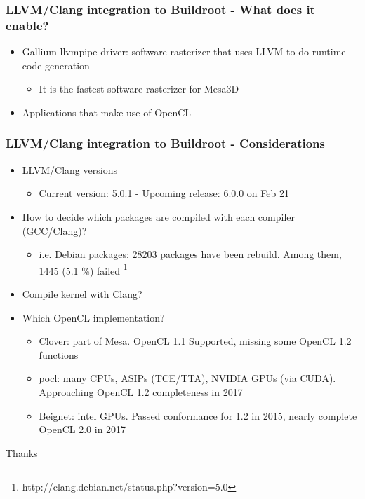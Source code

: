 \documentclass{beamer}
\begin{document}
\begin{frame}
\frametitle{LLVM/Clang integration to Buildroot - What does it enable?}
\begin{itemize}
  \item Gallium llvmpipe driver: software rasterizer that uses LLVM to do runtime code generation
  \begin{itemize}
    \item It is the fastest software rasterizer for Mesa3D
  \end{itemize}
  \item Applications that make use of OpenCL
\end{itemize}
\end{frame}

\begin{frame}
\frametitle{LLVM/Clang integration to Buildroot - Considerations}
\begin{itemize}
  \item LLVM/Clang versions
  \begin{itemize}
    \item Current version: 5.0.1 - Upcoming release: 6.0.0 on Feb 21
  \end{itemize}
  \item How to decide which packages are compiled with each compiler (GCC/Clang)?
  \begin{itemize}
    \item i.e. Debian packages: 28203 packages have been rebuild. Among them, 1445 (5.1 \%) failed \footnote{http://clang.debian.net/status.php?version=5.0}
  \end{itemize}
  \item Compile kernel with Clang?
  \item Which OpenCL implementation?
  \begin{itemize}
    \item {\selectfont Clover}: part of Mesa. OpenCL 1.1 Supported, missing some OpenCL 1.2 functions
    \item {\selectfont pocl}: many CPUs, ASIPs (TCE/TTA), NVIDIA GPUs (via CUDA). Approaching OpenCL 1.2 completeness in 2017
    \item {\selectfont Beignet}: intel GPUs. Passed conformance for 1.2 in 2015, nearly complete OpenCL 2.0 in 2017
  \end{itemize}
\end{itemize}
\end{frame}
\begin{frame}
\Huge{\centerline{Thanks}}
\end{frame}
\end{document}
